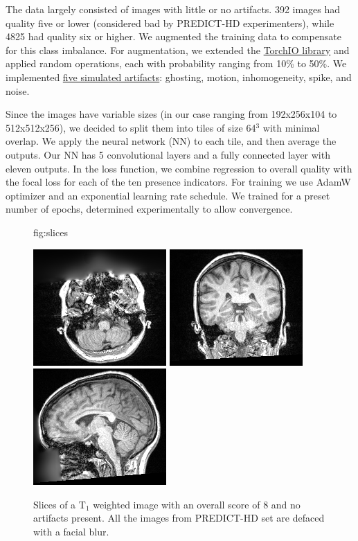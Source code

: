 \documentclass{midl} %
\begin{document}
The data largely consisted of images with little or no artifacts. 392 images had quality five or lower (considered bad by PREDICT-HD experimenters), while 4825 had quality six or higher. We augmented the training data to compensate for this class imbalance. For augmentation, we extended the \href{https://torchio.readthedocs.io/transforms/augmentation.html}{TorchIO library} and applied random operations, each with probability ranging from 10\% to 50\%. We implemented \href{https://github.com/OpenImaging/miqa/pull/339}{five simulated artifacts}: ghosting, motion, inhomogeneity, spike, and noise.

Since the images have variable sizes (in our case ranging from 192x256x104 to 512x512x256), we decided to split them into tiles of size 64$^3$ with minimal overlap. We apply the neural network (NN) to each tile, and then average the outputs. Our NN has 5 convolutional layers and a fully connected layer with eleven outputs. In the loss function, we combine regression to overall quality with the focal loss for each of the ten presence indicators. For training we use AdamW optimizer and an exponential learning rate schedule. We trained for a preset number of epochs, determined experimentally to allow convergence.


\begin{figure}[htbp]
\floatconts
  {fig:slices} %
  {\caption{Slices of a T$_1$ weighted image with an overall score of 8 and no artifacts present. All the images from PREDICT-HD set are defaced with a facial blur.}}
  {
  \includegraphics[width=0.32\linewidth]{axial.png}
  \includegraphics[width=0.32\linewidth]{coronal.png}
  \includegraphics[width=0.32\linewidth]{sagittal.png}
  }
\end{figure}
\end{document}
